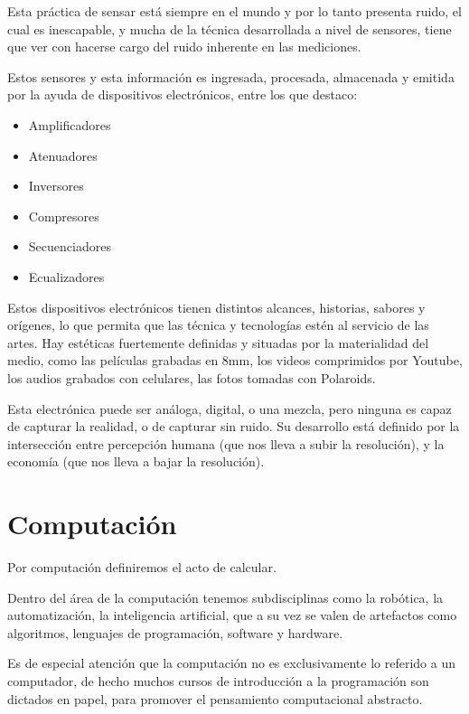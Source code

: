 \documentclass{article}
\begin{document}
Esta práctica de sensar está siempre en el mundo y por lo tanto presenta ruido, el cual es inescapable, y mucha de la técnica desarrollada a nivel de sensores, tiene que ver con hacerse cargo del ruido inherente en las mediciones.

Estos sensores y esta información es ingresada, procesada, almacenada y emitida por la ayuda de dispositivos electrónicos, entre los que destaco:

\begin{itemize}
    \item Amplificadores
    \item Atenuadores
    \item Inversores
    \item Compresores
    \item Secuenciadores
    \item Ecualizadores
\end{itemize}

Estos dispositivos electrónicos tienen distintos alcances, historias, sabores y orígenes, lo que permita que las técnica y tecnologías estén al servicio de las artes. Hay estéticas fuertemente definidas y situadas por la materialidad del medio, como las películas grabadas en 8mm, los videos comprimidos por Youtube, los audios grabados con celulares, las fotos tomadas con Polaroids.

Esta electrónica puede ser análoga, digital, o una mezcla, pero ninguna es capaz de capturar la realidad, o de capturar sin ruido. Su desarrollo está definido por la intersección entre percepción humana (que nos lleva a subir la resolución), y la economía (que nos lleva a bajar la resolución).

\clearpage

\section{Computación}

Por computación definiremos el acto de calcular.

Dentro del área de la computación tenemos subdisciplinas como la robótica, la automatización, la  inteligencia artificial, que a su vez se valen de artefactos como algoritmos, lenguajes de programación, software y hardware.

Es de especial atención que la computación no es exclusivamente lo referido a un computador, de hecho muchos cursos de introducción a la programación son dictados en papel, para promover el pensamiento computacional abstracto.
\end{document}
